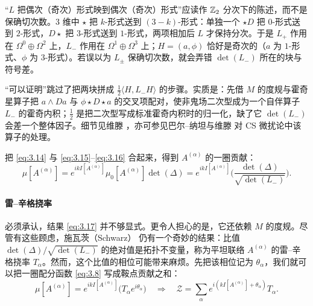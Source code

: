 \begin{yizhu}[易错点]
“$L$ 把偶次（奇次）形式映到偶次（奇次）形式”应读作 $\mathbb{Z}_2$ 分次下的陈述，而不是保确切次数。3 维中 $\star$ 把 $k$-形式送到 $(3-k)$-形式：单独一个 $\star D$ 把 $0$-形式送到 $2$-形式，$D\star$ 把 $3$-形式送到 $1$-形式，两项相加后 $L$ 才保持分次。于是 $L_+$ 作用在 $\Omega^0\oplus\Omega^2$ 上，$L_-$ 作用在 $\Omega^1\oplus\Omega^3$ 上；$H=(a,\phi)$ 恰好是奇次的（$a$ 为 $1$-形式、$\phi$ 为 $3$-形式）。若误以为 $L_\pm$ 保确切次数，就会弄错 $\det(L_-)$ 所在的块与符号差。
\end{yizhu}

\begin{yizhu}[含糊点]
“可以证明”跳过了把两块拼成 $\frac12\langle H,L_-H\rangle$ 的步骤。实质是：先借 $M$ 的度规与霍奇星算子把 $a\wedge Da$ 与 $\phi\star D\star a$ 的交叉项配对，使非鬼场二次型成为一个自伴算子 $L_-$ 的霍奇内积；$\frac12$ 是把二次型写成标准霍奇内积时的归一化，缺了它 $\det(L_-)$ 会差一个整体因子。细节见维滕 \cite{witten1989}，亦可参见巴尔--纳坦与维滕 \cite{barnatan1991} 对 CS 微扰论中该算子的处理。
\end{yizhu}

把 \eqref{eq:3.14} 与 \eqref{eq:3.15}--\eqref{eq:3.16} 合起来，得到 $A^{(\alpha)}$ 的一圈贡献：
\begin{equation}\tag{3.17}\label{eq:3.17}
  \mu[A^{(\alpha)}] = e^{ikI[A^{(\alpha)}]}\mu_0[A^{(\alpha)}]\det(\Delta)
  = e^{ikI[A^{(\alpha)}]}\Biggl(\frac{\det(\Delta)}{\sqrt{\det(L_-)}}\Biggr).
\end{equation}

\paragraph{雷--辛格挠率}
必须承认，结果 \eqref{eq:3.17} 并不够显式。更令人担心的是，它还依赖 $M$ 的度规。尽管有这些顾虑，施瓦茨（Schwarz）\cite{schwarz1978} 仍有一个奇妙的结果：比值 $\det(\Delta)/\sqrt{\det(L_-)}$ 的绝对值是拓扑不变量，称为平坦联络 $A^{(\alpha)}$ 的雷--辛格挠率 $T_\alpha$。然而，这个比值的相位可能带来麻烦。先把该相位记为 $\theta_\alpha$，我们就可以把一圈配分函数 \eqref{eq:3.8} 写成鞍点贡献之和：
\begin{equation}\tag{3.18}\label{eq:3.18}
  \mu[A^{(\alpha)}] = e^{ikI[A^{(\alpha)}]}\bigl(T_\alpha e^{i\theta_\alpha}\bigr)
  \quad\Longrightarrow\quad
  \mathcal{Z} = \sum_\alpha e^{i(kI[A^{(\alpha)}] + \theta_\alpha)}T_\alpha.
\end{equation}

